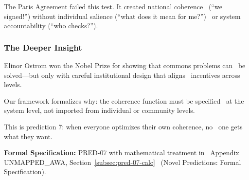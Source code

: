 The Paris Agreement failed this test. It created national coherence \
(``we signed!'') without individual salience (``what does it mean for me?'') \
or system accountability (``who checks?'').

\subsubsection{The Deeper Insight}

Elinor Ostrom won the Nobel Prize for showing that commons problems can \
be solved---but only with careful institutional design that aligns \
incentives across levels.

Our framework formalizes why: the coherence function must be specified \
at the system level, not imported from individual or community levels.

This is prediction 7: when everyone optimizes their own coherence, no \
one gets what they want.

\begin{cross-reference}
\textbf{Formal Specification:} PRED-07 with mathematical treatment in \
Appendix UNMAPPED_AWA, Section~\ref{subsec:pred-07-calc} \
(Novel Predictions: Formal Specification).
\end{cross-reference}
